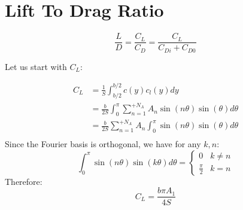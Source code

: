 \documentclass[letterpaper,12pt]{article}
\begin{document}
\section{Lift To Drag Ratio}

\begin{equation*}
	\frac L D = \frac{C_L}{C_D} = \frac {C_L} {C_{Di} + C_{D0}} 
\end{equation*}

Let us start with $C_L$:

\begin{align}
	C_L &= \frac 1 S \int_{b/2}^{b/2} c(y) c_l(y) dy  \nonumber \\
		&= \frac b {2S} \int_{0}^{\pi} \sum_{n=1}^{+N_A} A_n \sin(n\theta) \sin(\theta)d\theta \nonumber \\
		&= \frac b {2S}  \sum_{n=1}^{+N_A} A_n \int_{0}^{\pi} \sin(n\theta) \sin(\theta)d\theta \nonumber \\
\end{align}
Since the Fourier basis is orthogonal, we have for any $k, n$:
\begin{equation*}
	\int_0^{\pi} \sin(n\theta)\sin(k\theta)d\theta = 
	\begin{cases} 
		0 & k \neq n \\
		\frac{\pi}{2} & k = n
	 \end{cases}
\end{equation*}
Therefore:
\begin{equation}
	\label{eq:cl}
	C_L = \frac{b \pi A_1}{4S}
\end{equation}
\end{document}
